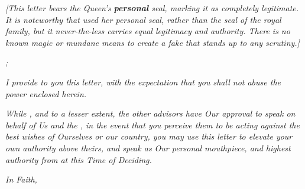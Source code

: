\documentclass[white]{GL2020}
\begin{document}
\name{\wQueenLetter{}}

\emph{[This letter bears the Queen’s \textbf{personal} seal, marking it as completely legitimate. It is noteworthy that \cQueen{\full} used her personal seal, rather than the seal of the royal family, but it never-the-less carries equal legitimacy and authority. There is no known magic or mundane means to create a fake that stands up to any scrutiny.]}

\vspace{1cm}

\textsl{\cHistory{};}

\vspace{0.5cm}

\textsl{I provide to you this letter, with the expectation that you shall not abuse the power enclosed herein.}

\textsl{While \cEvil{}, and to a lesser extent, the other advisors have Our approval to speak on behalf of Us and the \pFarm{}, in the event that you perceive them to be acting against the best wishes of Ourselves or our country, you may use this letter to elevate your own authority above theirs, and speak as Our personal mouthpiece, and highest authority from \pFarm{} at this Time of Deciding.}

\vspace{0.5cm}

\textsl{In Faith,}\\
\textsl{\cQueen{\full}}
\end{document}
